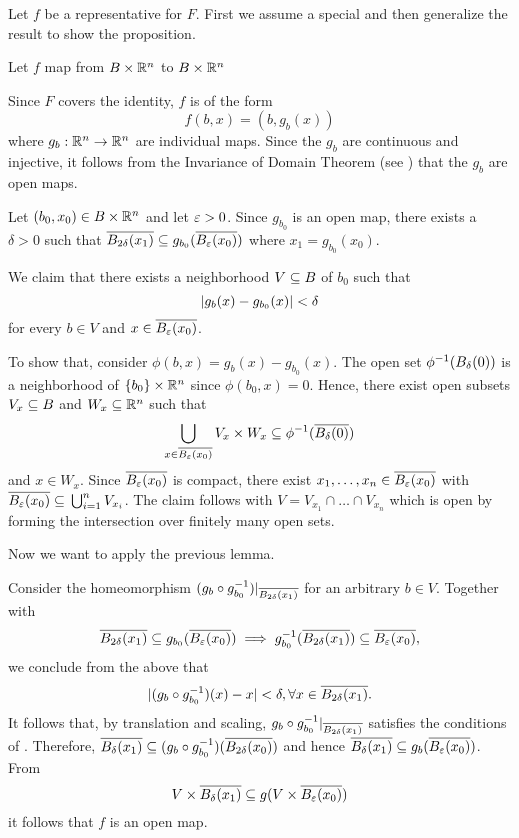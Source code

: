 \begin{myproof}
    Let $f$ be a representative for $F$.
    First we assume a special and then generalize the result to show the proposition.
    \begin{steps}
        \item Let $f$ map from $B \times \mathbb{R}^n$ to $B \times \mathbb{R}^n$
        
        Since $F$ covers the identity, $f$ is of the form
        \[ f(b, x) = (b, g_b(x)) \]
        where $g_b: \mathbb{R}^n \to \mathbb{R}^n$ are individual maps.
        Since the $g_b$ are continuous and injective,
        it follows from the Invariance of Domain Theorem (see \cite[cor.19.9]{brendon}) that the $g_b$ are open maps.
        
        Let $(b_0, x_0) \in B \times \mathbb{R}^n$ and let $\varepsilon{} > 0$.
        Since $g_{b_0}$ is an open map, there exists a $\delta > 0$ such that
        $\clball[2\delta][x_1] \sub g_{b_0}(\clball[\eps][x_0])$ where $x_1 = g_{b_0}(x_0)$.

        We claim that there exists a neighborhood $V \subseteq{} B$ of $b_0$ such that
        \[ \vert{} g_b(x) - g_{b_0}(x) \vert{} < \delta \]
        for every $b \in V$ and $x \in \clball[\eps][x_0]$.
        
        To show that, consider $\phi(b, x) = g_b(x) - g_{b_0}(x)$.
        The open set $\inv{\phi}(\ball[\delta])$ is a neighborhood of $\{b_0\} \times \mathbb{R}^n$ since $\phi(b_0, x) = 0$.
        Hence, there exist open subsets $V_x \subseteq{} B$ and $W_x \subseteq{} \mathbb{R}^n$ such that
        \[ \bigcup_{x \in \clball[\eps][x_0]} V_x \cross W_x \sub \inv{\phi}(\clball[\delta]) \]
        and $x \in W_x$.
        Since $\clball[\eps][x_0]$ is compact, there exist $x_1, \dots, x_n \in \clball[\eps][x_0]$ with $\clball[\eps][x_0] \sub \bigcup_{i = 1}^{n} V_{x_i}$.
        The claim follows with $V = V_{x_1} \cap \dots \cap V_{x_n}$
        which is open by forming the intersection over finitely many open sets.

        Now we want to apply the previous lemma.

        Consider the homeomorphism
        $(g_b \circ \inv{g_{b_0}})\restr{\clball[2\delta][x_1]}$
        for an arbitrary $b \in V$.
        Together with
        \[ \clball[2\delta][x_1] \sub g_{b_0}(\clball[\eps][x_0]) \implies \inv{g_{b_0}}(\clball[2\delta][x_1]) \sub \clball[\eps][x_0], \]
        we conclude from the above that
        \[ \abs{(g_b \circ \inv{g_{b_0}})(x) - x} < \delta, \forall x \in \clball[2\delta][x_1]. \]
        It follows that, by translation and scaling, $g_b \circ \inv{g_{b_0}}\restr{\clball[2\delta][x_1]}$ satisfies the conditions of .
        Therefore, $\clball[\delta][x_1] \sub (g_b \circ \inv{g_{b_0}})(\clball[2\delta][x_0])$ and hence $\clball[\delta][x_1] \sub g_b(\clball[\eps][x_0])$.
        From
        \[ V \cross \clball[\delta][x_1] \sub g(V \cross \clball[\eps][x_0]) \]
        it follows that $f$ is an open map.


\end{steps}
\end{myproof}
